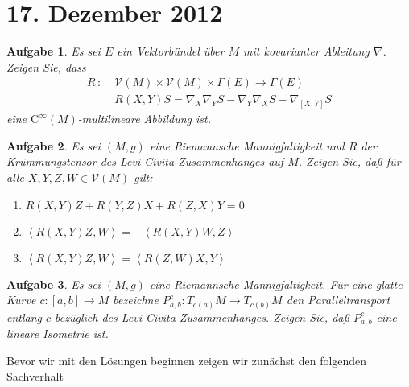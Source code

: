 \documentclass[paper=A4, twoside, chapterprefix=true, bibliography=totoc, headsepline]{scrbook}
\theoremstyle{plain}
\theoremstyle{nonumberplain}
\theoremstyle{empty}
\theoremstyle{break}
\newtheorem{Aufg}{Aufgabe}
\begin{document}
\section{17. Dezember 2012}
\setcounter{Aufg}{0} %
\setcounter{Loes}{0}

\begin{Aufg}
Es sei $E$ ein Vektorb\"undel über $M$ mit kovarianter Ableitung $\nabla$.
Zeigen Sie, dass
\begin{align*}
	R \, : \; &\mathcal{V} (M) \times \mathcal{V} (M) \times \Gamma (E) \longrightarrow \Gamma (E) \\[1ex]
	& R(X,Y)S = \nabla_X \nabla_Y S - \nabla_Y \nabla_X S - \nabla_{[X,Y]} S
\end{align*}
eine $\mathrm{C}^{\infty} (M)$-multilineare Abbildung ist.
\end{Aufg}

\begin{Aufg}
Es sei $(M,g)$ eine Riemannsche Mannigfaltigkeit und $R$ der Krümmungstensor des Levi-Civita-Zusammenhanges auf $M$.
Zeigen Sie, daß für alle $X,Y,Z,W \in \mathcal{V} (M)$ gilt:
\begin{enumerate}[label=\alph*),leftmargin=*,widest=b]
\item
	$R(X,Y)Z + R(Y,Z)X + R(Z,X)Y = 0$
\item
	$\left\langle R(X,Y)Z,W \right\rangle = - \left\langle R(X,Y)W,Z \right\rangle$
\item
	$\left\langle R(X,Y)Z,W \right\rangle = \left\langle R(Z,W)X,Y \right\rangle$
\end{enumerate}\end{Aufg}

\begin{Aufg}
Es sei $(M,g)$ eine Riemannsche Mannigfaltigkeit.
Für eine glatte Kurve $c : [a,b] \rightarrow M$ bezeichne $P^c_{a,b} : T_{c(a)} M \rightarrow T_{c(b)} M$ den Paralleltransport entlang $c$ bezüglich des Levi-Civita-Zusammenhanges.
Zeigen Sie, daß $P^c_{a,b}$ eine lineare Isometrie ist.
\end{Aufg}

Bevor wir mit den L\"osungen beginnen zeigen wir zun\"achst den folgenden Sachverhalt
\end{document}

